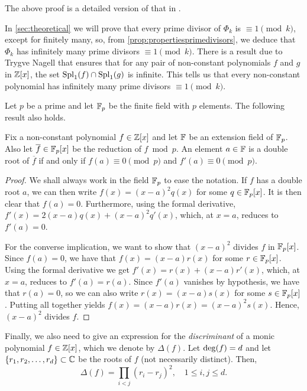 \documentclass[../main.tex]{subfiles}
\begin{document}
The above proof is a detailed version of that in \cite{Murty}.
\begin{remark}\label{remark:Nagell}
 In \cref{sec:theoretical} we will prove that every prime divisor of $\Phi_k$ is $\equiv 1\pmod{k}$, except for finitely many, so, from \cref{prop:propertiesprimedivisors}, we deduce that $\Phi_k$ has infinitely many prime divisors $\equiv 1\pmod{k}$. There is a result due to Trygve Nagell \cite{Murty} that ensures that for any pair of non-constant polynomials $f$ and $g$ in $\mathbb{Z}[x]$, the set $\operatorname{Spl}_1(f)\cap\operatorname{Spl}_1(g)$ is infinite. This tells us that every non-constant polynomial has infinitely many prime divisors $\equiv 1\pmod{k}$.
\end{remark}
Let $p$ be a prime and let $\mathbb{F}_p$ be the finite field with $p$ elements. The following result also holds.
\begin{proposition}\label{prop:doubleroots}
Fix a non-constant polynomial $f\in\mathbb{Z}[x]$ and let $\mathbb{F}$ be an extension field of $\mathbb{F}_p$. Also let $\overline{f}\in\mathbb{F}_p[x]$ be the reduction of $f \bmod{p}$. An element $a\in\mathbb{F}$ is a double root of $\overline{f}$ if and only if $f(a)\equiv 0\pmod{p}$ and $f'(a)\equiv 0\pmod{p}$.
\end{proposition}
\begin{proof}
	We shall always work in the field $\mathbb{F}_p$ to ease the notation. If $f$ has a double root $a$, we can then write $f(x)=(x-a)^2q(x)$ for some $q\in\mathbb{F}_p[x]$. It is then clear that $f(a)=0$. Furthermore, using the formal derivative, $f'(x)=2(x-a)q(x)+(x-a)^2q'(x)$, which, at $x=a$, reduces to $f'(a)=0$.
	
	For the converse implication, we want to show that $(x-a)^2$ divides $f$ in $\mathbb{F}_p[x]$. Since $f(a)=0$, we have that $f(x)=(x-a)r(x)$ for some $r\in\mathbb{F}_p[x]$. Using the formal derivative we get $f'(x)=r(x)+(x-a)r'(x)$, which, at $x=a$, reduces to $f'(a)=r(a)$. Since $f'(a)$ vanishes by hypothesis, we have that $r(a)=0$, so we can also write $r(x)=(x-a)s(x)$ for some $s\in\mathbb{F}_p[x]$. Putting all together yields $f(x)=(x-a)r(x)=(x-a)^2s(x)$. Hence, $(x-a)^2$ divides $f$.
\end{proof}

Finally, we also need to give an expression for the \emph{discriminant} of a monic polynomial $f\in\mathbb{Z}[x]$, which we denote by $\Delta(f)$. Let $\operatorname{deg}(f)=d$ and let $\{r_1,r_2,\dots,r_d\}\subset\mathbb{C}$ be the roots of $f$ (not necessarily distinct). Then, 
	\begin{equation}\label{eq:discrim}
		\Delta(f)=\prod_{i<j}(r_i-r_j)^2, \quad 1\leqslant i,j\leqslant d.
	\end{equation}
\end{document}
